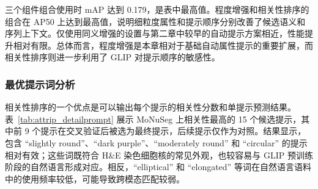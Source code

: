 三个组件组合使用时 mAP 达到 0.179，是表中最高值。程度增强和相关性排序的组合在 AP50 上达到最高值，说明细粒度属性和提示顺序分别改善了候选语义和序列上下文。仅使用同义增强的设置与第二章中较早的自动提示方案相近，性能提升相对有限。总体而言，程度增强是本章相对于基础自动属性提示的重要扩展，而相关性排序则进一步利用了 GLIP 对提示顺序的敏感性。

\subsubsection{最优提示词分析}

相关性排序的一个优点是可以输出每个提示的相关性分数和单提示预测结果。表~\ref{tab:attrip_detailprompt} 展示 MoNuSeg 上相关性最高的 15 个候选提示，其中前 9 个提示在交叉验证后被选为最终提示，后续提示仅作为对照。结果显示，包含 ``slightly round''、``dark purple''、``moderately round'' 和 ``circular'' 的提示相对有效；这些词既符合 H\&E 染色细胞核的常见外观，也较容易与 GLIP 预训练阶段的自然语言形成对应。相反，``elliptical'' 和 ``elongated'' 等词在自然语言语料中的使用频率较低，可能导致跨模态匹配较弱。

